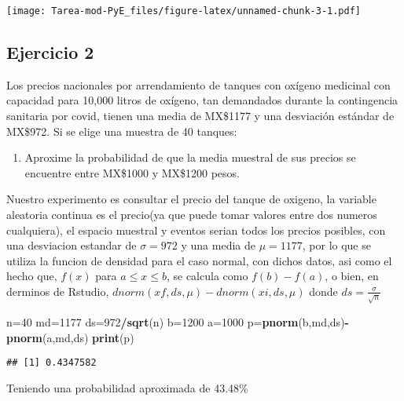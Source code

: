 \documentclass[
]{article}
\newenvironment{Shaded}{\begin{snugshade}}{\end{snugshade}}
\newcommand{\DecValTok}[1]{\textcolor[rgb]{0.00,0.00,0.81}{#1}}
\newcommand{\FunctionTok}[1]{\textcolor[rgb]{0.13,0.29,0.53}{\textbf{#1}}}
\newcommand{\NormalTok}[1]{#1}
\newcommand{\OtherTok}[1]{\textcolor[rgb]{0.56,0.35,0.01}{#1}}
\newcommand{\SpecialCharTok}[1]{\textcolor[rgb]{0.81,0.36,0.00}{\textbf{#1}}}
\providecommand{\tightlist}{%
  \setlength{\itemsep}{0pt}\setlength{\parskip}{0pt}}
\begin{document}
\texttt{[image: Tarea-mod-PyE\_files/figure-latex/unnamed-chunk-3-1.pdf]}

\subsection{Ejercicio 2}\label{ejercicio-2}

Los precios nacionales por arrendamiento de tanques con oxígeno
medicinal con capacidad para 10,000 litros de oxígeno, tan demandados
durante la contingencia sanitaria por covid, tienen una media de
MX\$1177 y una desviación estándar de MX\$972. Si se elige una muestra
de 40 tanques:

\begin{enumerate}
\def\labelenumi{\arabic{enumi}.}
\tightlist
\item
  Aproxime la probabilidad de que la media muestral de sus precios se
  encuentre entre MX\$1000 y MX\$1200 pesos.
\end{enumerate}

Nuestro experimento es consultar el precio del tanque de oxigeno, la
variable aleatoria continua es el precio(ya que puede tomar valores
entre dos numeros cualquiera), el espacio muestral y eventos serian
todos los precios posibles, con una desviacion estandar de
\(\sigma=972\) y una media de \(\mu=1177\), por lo que se utiliza la
funcion de densidad para el caso normal, con dichos datos, asi como el
hecho que, \(f(x)\) para \(a\leq x\leq b\), se calcula como
\(f(b)-f(a)\), o bien, en derminos de Rstudio,
\(dnorm(xf,ds,\mu)-dnorm(xi,ds,\mu)\) donde
\(ds=\frac{\sigma}{\sqrt{n}}\)

\begin{Shaded}
\begin{Highlighting}[]
\NormalTok{n}\OtherTok{=}\DecValTok{40}
\NormalTok{md}\OtherTok{=}\DecValTok{1177}
\NormalTok{ds}\OtherTok{=}\DecValTok{972}\SpecialCharTok{/}\FunctionTok{sqrt}\NormalTok{(n)}
\NormalTok{b}\OtherTok{=}\DecValTok{1200}
\NormalTok{a}\OtherTok{=}\DecValTok{1000}
\NormalTok{p}\OtherTok{=}\FunctionTok{pnorm}\NormalTok{(b,md,ds)}\SpecialCharTok{{-}}\FunctionTok{pnorm}\NormalTok{(a,md,ds)}
\FunctionTok{print}\NormalTok{(p)}
\end{Highlighting}
\end{Shaded}

\begin{verbatim}
## [1] 0.4347582
\end{verbatim}

Teniendo una probabilidad aproximada de 43.48\%
\end{document}
